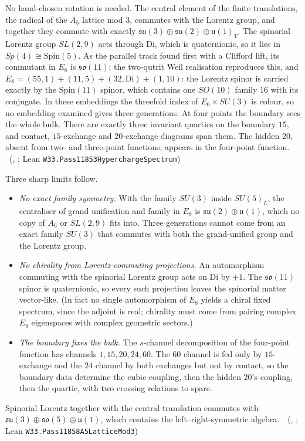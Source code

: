 No hand-chosen rotation is needed. The central element of the finite translations, the radical of the $A_5$ lattice mod $3$,
commutes with the Lorentz group, and together they commute with exactly $\mathfrak{su}(3)\oplus\mathfrak{su}(2)\oplus\mathfrak u(1)_Y$.
The spinorial Lorentz group $SL(2,9)$ acts through Di, which is quaternionic, so it lies in $Sp(4)\cong\mathrm{Spin}(5)$. As the
parallel track found first with a Clifford lift, its commutant in $E_8$ is $\mathfrak{so}(11)$; the two-qutrit Weil realisation
reproduces this, and
$E_8=(55,1)+(11,5)+(32,\mathrm{Di})+(1,10)$: the Lorentz spinor is carried exactly by the $\mathrm{Spin}(11)$ spinor, which contains
one $SO(10)$ family $16$ with its conjugate. In these embeddings the threefold index of $E_6\times SU(3)$ is colour, so no
embedding examined gives three generations. At four points the boundary sees the whole bulk. There are exactly three invariant
quartics on the boundary $15$, and contact, $15$-exchange and $20$-exchange diagrams span them. The hidden $20$, absent from two-
and three-point functions, appears in the four-point function.
\tierT\,\tierC\ (, ; Lean \texttt{W33.Pass11853HyperchargeSpectrum})

Three sharp limits follow.
\begin{itemize}
\item \emph{No exact family symmetry.} With the family $SU(3)$ inside $SU(5)_L$, the centraliser of grand unification and
family in $E_8$ is $\mathfrak{su}(2)\oplus\mathfrak u(1)$, which no copy of $A_6$ or $SL(2,9)$ fits into. Three generations cannot
come from an exact family $SU(3)$ that commutes with both the grand-unified group and the Lorentz group.
\item \emph{No chirality from Lorentz-commuting projections.} An automorphism commuting with the spinorial Lorentz group acts
on Di by $\pm1$. The $\mathfrak{so}(11)$ spinor is quaternionic, so every such projection leaves the spinorial matter
vector-like. (In fact no single automorphism of $E_8$ yields a chiral fixed spectrum, since the adjoint is real;
chirality must come from pairing complex $E_8$ eigenspaces with complex geometric sectors.)
\item \emph{The boundary fixes the bulk.} The $s$-channel decomposition of the four-point function has channels
$1,15,20,24,60$. The $60$ channel is fed only by $15$-exchange and the $24$ channel by both exchanges but not by contact, so the
boundary data determine the cubic coupling, then the hidden $20$'s coupling, then the quartic, with two crossing relations to
spare.
\end{itemize}
Spinorial Lorentz together with the central translation commutes with $\mathfrak{su}(3)\oplus\mathfrak{so}(5)\oplus\mathfrak u(1)$,
which contains the left--right-symmetric algebra.
\tierT\,\tierC\ (, ; Lean \texttt{W33.Pass11858A5LatticeMod3})

